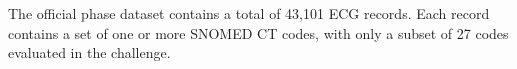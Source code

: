 \documentclass[twocolumn]{cinc}
\begin{document}
The official phase dataset contains a total of 43,101 ECG records.
Each record contains a set of one or more SNOMED CT codes, with only a subset of 27 codes evaluated in the challenge.
\end{document}

